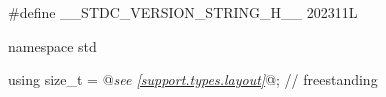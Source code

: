 %
%
%
%
%
%
%
%
%
%
%
%
%
%
%
%
%
%
%
%
%
%
%
\begin{codeblock}
#define __STDC_VERSION_STRING_H__ 202311L

namespace std {
  using size_t = @\textit{see \ref{support.types.layout}}@;                                            // freestanding

}
\end{codeblock}
